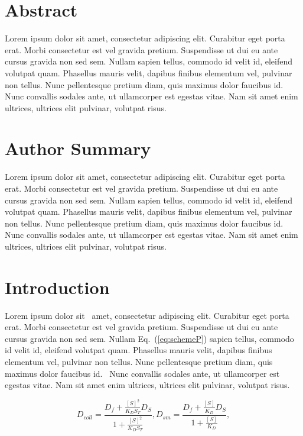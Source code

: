\documentclass[10pt,letterpaper]{article}
\begin{document}
\section*{Abstract}

Lorem ipsum dolor sit amet, consectetur adipiscing elit. Curabitur eget porta
erat. Morbi consectetur est vel gravida pretium. Suspendisse ut dui eu ante
cursus gravida non sed sem. Nullam sapien tellus, commodo id velit id, eleifend
volutpat quam. Phasellus mauris velit, dapibus finibus elementum vel, pulvinar
non tellus. Nunc pellentesque pretium diam, quis maximus dolor faucibus id. Nunc
convallis sodales ante, ut ullamcorper est egestas vitae. Nam sit amet enim
ultrices, ultrices elit pulvinar, volutpat risus.


\section*{Author Summary}
Lorem ipsum dolor sit amet, consectetur adipiscing elit. Curabitur eget porta
erat. Morbi consectetur est vel gravida pretium. Suspendisse ut dui eu ante
cursus gravida non sed sem. Nullam sapien tellus, commodo id velit id, eleifend
volutpat quam. Phasellus mauris velit, dapibus finibus elementum vel, pulvinar
non tellus. Nunc pellentesque pretium diam, quis maximus dolor faucibus id. Nunc
convallis sodales ante, ut ullamcorper est egestas vitae. Nam sit amet enim
ultrices, ultrices elit pulvinar, volutpat risus.

\linenumbers

\section*{Introduction}
Lorem ipsum dolor sit~\cite{bib1} amet, consectetur adipiscing elit. Curabitur
eget porta erat. Morbi consectetur est vel gravida pretium. Suspendisse ut dui
eu ante cursus gravida non sed sem. Nullam Eq.~(\ref{eq:schemeP}) sapien tellus,
commodo id velit id, eleifend volutpat quam. Phasellus mauris velit, dapibus
finibus elementum vel, pulvinar non tellus. Nunc pellentesque pretium diam, quis
maximus dolor faucibus id.~\cite{bib2} Nunc convallis sodales ante, ut
ullamcorper est egestas vitae. Nam sit amet enim ultrices, ultrices elit
pulvinar, volutpat risus.

\begin{equation}\label{eq:schemeP} 
D_{coll} = \frac{D_f+\frac{[S]^2}{K_D S_T} D_S} {1+\frac{[S]^2}{K_D S_T}}, 
D_{sm} = \frac{D_f+ \frac{[S]}{K_D} D_S}{1+\frac{[S]}{K_D}},
\end{equation}
\end{document}
